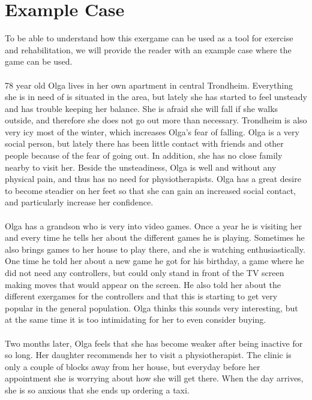 \section{Example Case}
To be able to understand how this exergame can be used as a tool for exercise and rehabilitation, we will provide the reader with an example case where the game can be used. \\ \\
78 year old Olga lives in her own apartment in central Trondheim. Everything she is in need of is situated in the area, but lately she has started  to feel unsteady and has trouble keeping her balance. She is afraid she will fall if she walks outside, and therefore she does not go out more than necessary. Trondheim is also very icy most of the winter, which increases Olga's fear of falling. Olga is a very social person, but lately there has been little contact with friends and other people because of the fear of going out. In addition, she has no close family nearby to visit her. Beside the unsteadiness, Olga is well and without any physical pain, and thus has no need for physiotherapists. Olga has a great desire to become steadier on her feet so that she can gain an increased social contact, and particularly increase her confidence. \\ \\
Olga has a grandson who is very into video games. Once a year he is visiting her and every time he tells her about the different games he is playing. Sometimes he also brings games to her house to play there, and she is watching enthusiastically. One time he told her about a new game he got for his birthday, a game where he did not need any controllers, but could only stand in front of the TV screen making moves that would appear on the screen. He also told her about the different exergames for the controllers and that this is starting to get very popular in the general population. Olga thinks this sounds very interesting, but at the same time it is too intimidating for her to even consider buying.   \\ \\
Two months later, Olga feels that she has become weaker after being inactive for so long. Her daughter recommends her to visit a physiotherapist. The clinic is only a couple of blocks away from her house, but everyday before her appointment she is worrying about how she will get there. When the day arrives, she is so anxious that she ends up ordering a taxi. \\ \\
